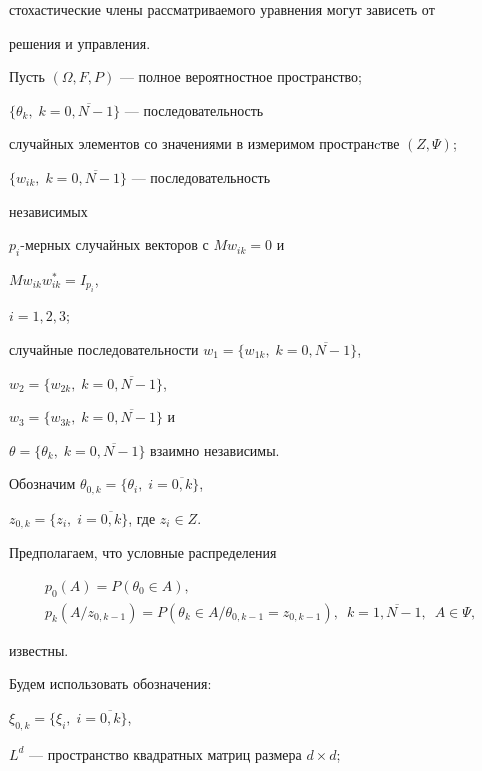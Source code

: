стохастические члены рассматриваемого уравнения могут зависеть от


решения и управления.





Пусть $(\Omega,F,P)$ --- полное вероятностное пространство;


$\bigl\{\theta_{k},\; k=\overline{0,N-1}\bigr\}$ --- последовательность


случайных элементов со значениями в измеримом пространcтве $(Z,\Psi)$;


$\bigl\{w_{ik},\;k=\overline{0,N-1}\bigr\}$ --- последовательность


независимых


$p_{i}$-мерных случайных векторов с $Mw_{ik}=0$ и


$Mw_{ik}w_{ik}^{*}=I_{p_{i}}$,


$i=1,2,3$;


случайные последовательности $w_{1}=\bigl\{w_{1k},\;


k=\overline{0,N-1}\bigr\}$,


$w_{2}=\bigl\{w_{2k},\; k=\overline{0,N-1}\bigr\}$,


$w_{3}=\bigl\{w_{3k},\; k=\overline{0,N-1}\bigr\}$ и


$\theta=\bigl\{\theta_{k},\; k=\overline{0,N-1}\bigr\}$ взаимно независимы.


Обозначим $\theta_{0,k}=\bigl\{\theta_{i},\; i=\overline{0,k}\bigr\}$,


$z_{0,k}=\bigl\{z_{i},\; i=\overline{0,k}\bigr\}$, где $z_{i}\in Z$.


Предполагаем, что условные распределения


\begin{gather*}


p_{0}(A)=P(\theta_{0}\in A),\\


%


p_{k}(A/z_{0,k-1})=


P(\theta_{k}\in A/\theta_{0,k-1}=z_{0,k-1}),\ \;


k=\overline{1,N-1},\ \; A\in \Psi,


\end{gather*}


известны.


Будем использовать обозначения:


$\xi_{0,k}=\bigl\{\xi_{i},\; i=\overline{0,k}\bigr\}$,


$L^{d}$ --- пространство квадратных матриц размера $d\times d$;



